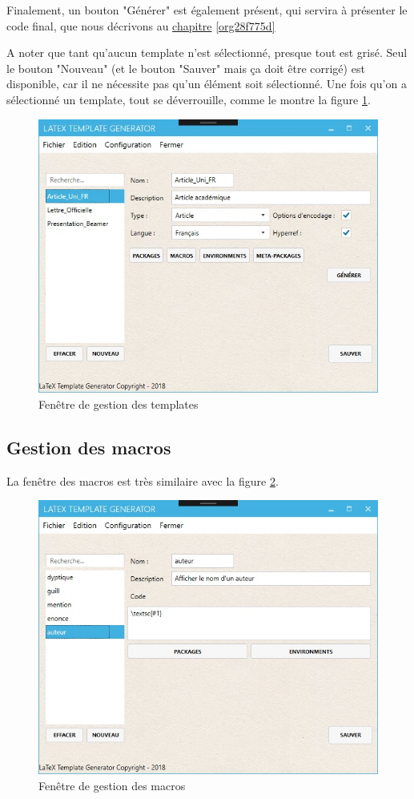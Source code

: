 \documentclass[a4paper, oneside]{article}
\begin{document}
Finalement, un bouton "Générer" est également présent, qui servira à présenter
le code final, que nous décrivons au \hyperref[org28f775d]{chapitre}  \ref{org28f775d}

A noter que tant qu'aucun template n'est sélectionné, presque tout est
grisé. Seul le bouton "Nouveau" (et le bouton "Sauver" mais ça doit être
corrigé) est disponible, car il ne nécessite pas qu'un élément soit
sélectionné. Une fois qu'on a sélectionné un template, tout se déverrouille,
comme le montre la figure \ref{fig:org4be422c}.

\begin{figure}[htbp]
\centering
\includegraphics[width=.9\linewidth]{../Images/template_full.jpg}
\caption{\label{fig:org4be422c}
Fenêtre de gestion des templates}
\end{figure}

\subsection{Gestion des macros}
\label{sec:org6e52093}

La fenêtre des macros est très similaire avec la figure \ref{fig:org2401d34}.

\begin{figure}[htbp]
\centering
\includegraphics[width=.9\linewidth]{../Images/macro.jpg}
\caption{\label{fig:org2401d34}
Fenêtre de gestion des macros}
\end{figure}
\end{document}

